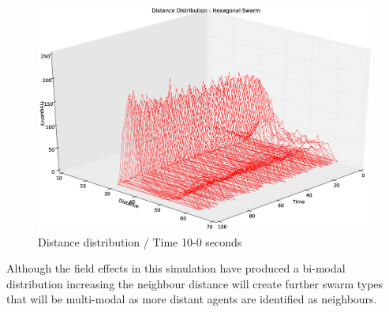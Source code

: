\begin{figure}[H]
\begin{center}
\includegraphics[width=13cm]{CHAPTER-5/figures/StabilityDistibutionHyper3D2}
\end{center}
\caption{Distance distribution / Time 10-0 seconds\label{methods:StabilityDistributionHyper3D2}}
\end{figure}

Although the field effects in this simulation have produced a bi-modal distribution increasing the neighbour distance will create further swarm types that will be multi-modal as more distant agents are identified as neighbours.

